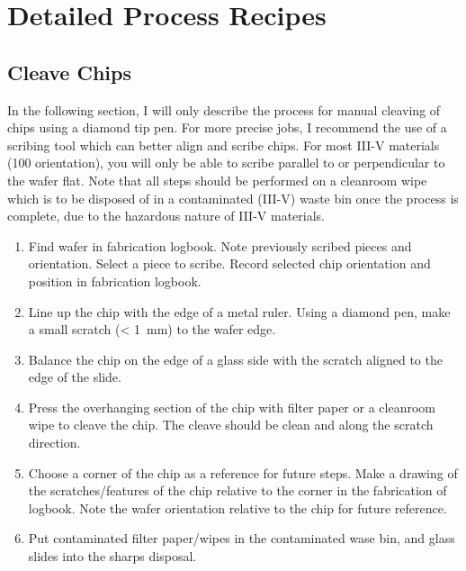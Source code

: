 \section{Detailed Process Recipes}
\subsection{Cleave Chips}
\label{sec:cleave}
In the following section, I will only describe the process for manual cleaving of chips using a diamond tip pen.
For more precise jobs, I recommend the use of a scribing tool which can better align and scribe chips.
For most III-V materials (100 orientation), you will only be able to scribe parallel to or perpendicular to the wafer flat.
Note that all steps should be performed on a cleanroom wipe which is to be disposed of in a contaminated (III-V) waste bin
once the process is complete, due to the hazardous nature of III-V materials.
\begin{enumerate}
    \item Find wafer in fabrication logbook. Note previously scribed pieces and orientation. Select a piece to scribe. Record selected chip orientation and position in fabrication logbook.
    \item Line up the chip with the edge of a metal ruler. Using a diamond pen, make a small scratch (< \SI{1}{\milli\meter}) to the wafer edge.
    \item Balance the chip on the edge of a glass side with the scratch aligned to the edge of the slide.
    \item Press the overhanging section of the chip with filter paper or a cleanroom wipe to cleave the chip. The cleave should be clean and along the scratch direction.
    \item Choose a corner of the chip as a reference for future steps. Make a drawing of the scratches/features of the chip relative to the corner in the fabrication of logbook. Note the wafer orientation relative to the chip for future reference.
    \item Put contaminated filter paper/wipes in the contaminated wase bin, and glass slides into the sharps disposal.
\end{enumerate}


